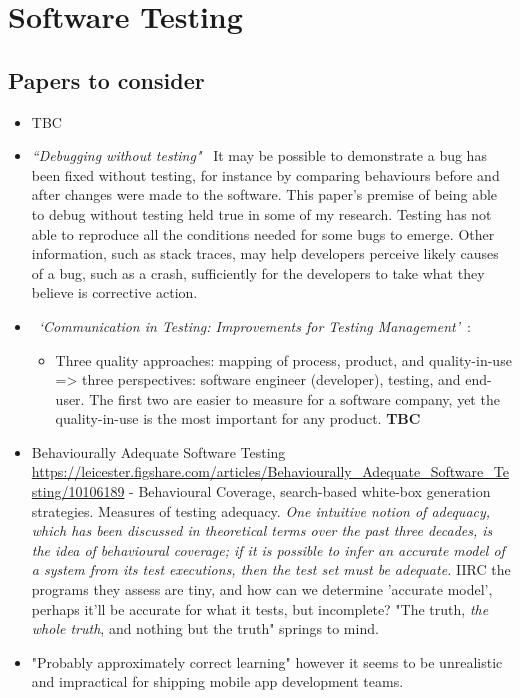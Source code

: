 \section{Software Testing}

\subsection{Papers to consider}
\begin{itemize}
    \item TBC
    \item \emph{``Debugging without testing"}~\cite{ghardallou2016debugging_without_testing} It may be possible to demonstrate a bug has been fixed without testing, for instance by comparing behaviours before and after changes were made to the software. This paper's premise of being able to debug without testing held true in some of my research. Testing has not able to reproduce all the conditions needed for some bugs to emerge. Other information, such as stack traces, may help developers perceive likely causes of a bug, such as a crash, sufficiently for the developers to take what they believe is corrective action.  
    
    \item ~\emph{`Communication in Testing: Improvements for Testing Management'}~\citep{paakkonen2009_communication_in_testing}: 
    \begin{itemize}
        \item Three quality approaches: mapping of process, product, and quality-in-use => three perspectives: software engineer (developer), testing, and end-user. The first two are easier to measure for a software company, yet the quality-in-use is the most important for any product. \textbf{TBC}
    \end{itemize}
    
    \item Behaviourally Adequate Software Testing \url{https://leicester.figshare.com/articles/Behaviourally_Adequate_Software_Testing/10106189} - Behavioural Coverage, search-based white-box generation strategies. Measures of testing adequacy. \emph{One intuitive notion of adequacy, which has been discussed in theoretical terms over the past three decades, is the idea of behavioural coverage; if it is possible to infer an accurate model of a system from its test executions, then the test set must be adequate.} IIRC the programs they assess are tiny, and how can we determine 'accurate model', perhaps it'll be accurate for what it tests, but incomplete? "The truth, \emph{the whole truth}, and nothing but the truth" springs to mind. %
    
    \item "Probably approximately correct learning" however it seems to be unrealistic and impractical for shipping mobile app development teams.
\end{itemize}


